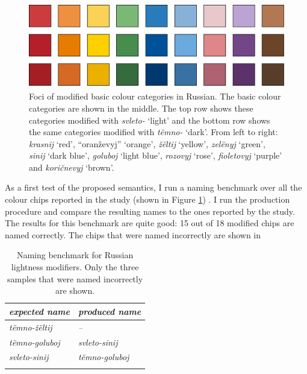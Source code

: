 \begin{figure}[htpb]
  \centering
  \includegraphics[height=3.75cm]{./achromatic/figures/russian-modified-foci.pdf}
  \caption[Foci of modified basic colour categories in Russian]{Foci
    of modified basic colour categories in Russian. The basic colour
    categories are shown in the middle. The top row shows these
    categories modified with \textit{svleto-} `light' and the bottom
    row shows the same categories modified with \textit{t\"emno-}
    `dark'.  From left to right: \textit{krasnij} `red', ``oran\v
    zevyj'' `orange', \textit{\v z\"eltij} `yellow',
    \textit{zel\"enyj} `green', \textit{sinij} `dark blue',
    \textit{goluboj} `light blue', \textit{rozovyj} `rose',
    \textit{fioletovyj} `purple' and \textit{kori\v cnevyj} `brown'.}
  \label{f:ams-russian-basic-modifiers}
\end{figure}

As a first test of the proposed semantics, I run a naming benchmark
over all the colour chips reported in the study (shown in Figure
\ref{f:ams-russian-basic-modifiers})
. 
I run the production
procedure and compare the resulting names to the ones reported by the
study. The results for this benchmark are quite good: 15 out of 18
modified chips are named correctly. The chips that were named
incorrectly are shown in 

\begin{table}[htpb]
  \centering
  \begin{tabular}{>{\itshape}l>{\itshape}l}
  \lsptoprule
    \normalfont expected name & \normalfont produced name \\
    \midrule
    t\"emno-\v z\"eltij & \normalfont -- \\
    t\"emno-goluboj & svleto-sinij \\
    svleto-sinij & t\"emno-goluboj\\
    \lspbottomrule
  \end{tabular}
  \caption[Naming benchmark for Russian lightness modifiers]{Naming benchmark for Russian lightness modifiers. Only the three samples that were named incorrectly are shown.}
  \label{t:ams-russian-naming-benchmark}
\end{table}

